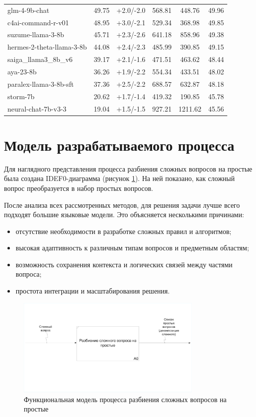 \begin{table}[H]
\begin{tabular}{|l|c|c|c|c|c|}
		glm-4-9b-chat & 49.75 & +2.0/-2.0 & 568.81 & 448.76 & 49.96 \\
		c4ai-command-r-v01 & 48.95 & +3.0/-2.1 & 529.34 & 368.98 & 49.85 \\
		suzume-llama-3-8b & 45.71 & +2.3/-2.6 & 641.18 & 858.96 & 49.38 \\
		hermes-2-theta-llama-3-8b & 44.08 & +2.4/-2.3 & 485.99 & 390.85 & 49.15 \\
		saiga\_llama3\_8b\_v6 & 39.17 & +2.1/-1.6 & 471.51 & 463.62 & 48.44 \\
		aya-23-8b & 36.26 & +1.9/-2.2 & 554.34 & 433.51 & 48.02 \\
		paralex-llama-3-8b-sft & 37.36 & +2.5/-2.2 & 688.57 & 632.87 & 48.18 \\
		storm-7b & 20.62 & +1.7/-1.4 & 419.32 & 190.85 & 45.78 \\
		neural-chat-7b-v3-3 & 19.04 & +1.5/-1.5 & 927.21 & 1211.62 & 45.56 \\
		\hline
	\end{tabular}
\end{table}

\section{Модель разрабатываемого процесса}

Для наглядного представления процесса разбиения сложных вопросов на простые была создана IDEF0-диаграмма (рисунок \ref{fig:idef0}). На ней показано, как сложный вопрос преобразуется в набор простых вопросов.

После анализа всех рассмотренных методов, для решения задачи лучше всего подходят большие языковые модели. Это объясняется несколькими причинами:
\begin{itemize}
	\item отсутствие необходимости в разработке сложных правил и алгоритмов;
	\item высокая адаптивность к различным типам вопросов и предметным областям;
	\item возможность сохранения контекста и логических связей между частями вопроса;
	\item простота интеграции и масштабирования решения.
\end{itemize}

\begin{figure}[H]
	\centering
	\includegraphics[width=0.8\textwidth]{images/analyth_idef0.pdf}
	\caption{Функциональная модель процесса разбиения сложных вопросов на простые}
	\label{fig:idef0}
\end{figure}

